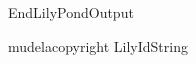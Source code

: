 %
\def\ifundefined#1{\expandafter\ifx\csname#1\endcsname\relax}
%
\def\SkipLilydefs{\endinput}
\ifundefined{EndLilyPondOutput}
        \def\EndLilyPondOutput{\csname bye\endcsname}
        \def\SkipLilydefs{}
\fi
\SkipLilydefs
%
\ifundefined{mudelacopyright}
        \def\mudelacopyright{\copyright\ \number\year}
\fi
\ifundefined{LilyIdString}
        \def\LilyIdString{Lily was here}
\fi

\def\musicmathdef#1#2{\def#1{\musicmathchar{#2}}}
\def\musicmathchar#1{\musicmathfont\char#1}

\def\topalign#1{\vbox to 0pt{#1\vss}}
\def\botalign#1{\vbox to 0pt{\vss #1}}

\def\centeralign#1{\hbox to 0pt{\hss#1\hss}}
\def\leftalign#1{\hbox to 0pt{#1\hss}}
\def\rightalign#1{\hbox to 0pt{\hss#1}}


\parindent=0pt
\newdimen\smallspace
\newdimen\interlinedist

\newdimen\stemthickness
\newcount\n                     %
\newdimen\staffheight
\newdimen\notewidth
\newdimen\noteheight
\newdimen\staffrulethickness
\newdimen\interstaffrule
\newdimen\dist

\def\musixtwentydefs{
        \twentyfonts
        \musixcalc
}


